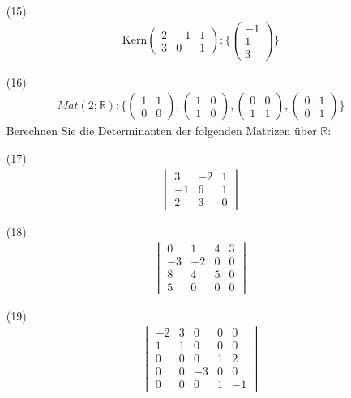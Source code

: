 \documentclass[11pt]{report}
\newcommand*\Zb[1] {\mathbb{#1}}
\begin{document}
\begin{itemize}
\item[(15)] 
\begin{align}
\text{Kern}\begin{pmatrix} 2 & -1 & 1 \\ 3 & 0 & 1\end{pmatrix}: \{\begin{pmatrix} -1 \\ 1 \\ 3 \end{pmatrix}\}
\end{align}

\item[(16)] 
\begin{align}
Mat(2; \Zb{R}): \{\begin{pmatrix} 1 & 1 \\ 0 & 0 \end{pmatrix}, \begin{pmatrix} 1 & 0 \\ 1 & 0 \end{pmatrix}, \begin{pmatrix} 0 & 0 \\ 1 & 1 \end{pmatrix}, \begin{pmatrix} 0 & 1 \\ 0 & 1 \end{pmatrix}\}
\end{align}
\vspace*{0.6cm}
Berechnen Sie die Determinanten der folgenden Matrizen über $\Zb{R}$:
\item[(17)] 
\begin{align}
\begin{vmatrix}
3 & -2 & 1 \\
-1 & 6 & 1 \\
2 & 3 & 0
\end{vmatrix}
\end{align}

\item[(18)] 
\begin{align}
\begin{vmatrix}
0 & 1 & 4 & 3 \\
-3 & -2 & 0 & 0 \\
8 & 4 & 5 & 0 \\
5 & 0 & 0 & 0
\end{vmatrix}
\end{align}

\item[(19)] 
\begin{align}
\begin{vmatrix}
-2 & 3 & 0 & 0 & 0 \\
1 & 1 & 0 & 0 & 0 \\
0 & 0 & 0 & 1 & 2 \\
0 & 0 & -3 & 0 & 0 \\
0 & 0 & 0 & 1 & -1
\end{vmatrix}
\end{align}


\end{itemize}
\end{document}
